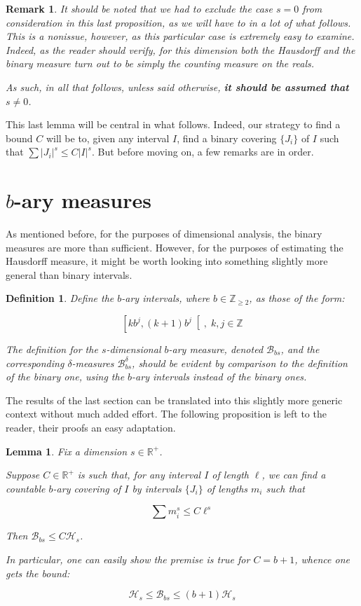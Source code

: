\documentclass[11pt]{amsart}
\newcommand{\R}{\mathbb{R}}
\newcommand{\Z}{\mathbb{Z}}
\newcommand{\HH}{\mathcal{H}}
\newcommand{\BB}{\mathcal{B}}
\newtheorem{lemma}{Lemma}
\newtheorem{definition}{Definition}
\newtheorem{remark}{Remark}
\begin{document}
\begin{remark} \label{dimnotzero}
It should be noted that we had to exclude the case $s = 0$ from consideration in this last proposition, as we will have to in a lot of what follows. This is a nonissue, however, as this particular case is extremely easy to examine. Indeed, as the reader should verify, for this dimension both the Hausdorff and the binary measure turn out to be simply the counting measure on the reals.

As such, in all that follows, unless said otherwise, \textbf{it should be assumed that $s \neq 0$}.
\end{remark}

This last lemma will be central in what follows. Indeed, our strategy to find a bound $C$ will be to, given any interval $I$, find a binary covering $\{J_i\}$ of $I$ such that $\sum \lvert J_i \rvert^s \leq C \lvert I \rvert^s$. But before moving on, a few remarks are in order.

\section{$b$-ary measures}

As mentioned before, for the purposes of dimensional analysis, the binary measures are more than sufficient. However, for the purposes of estimating the Hausdorff measure, it might be worth looking into something slightly more general than binary intervals.

\begin{definition}
Define the $b$-ary intervals, where $b \in \Z_{\geq 2}$, as those of the form:

\[\left[k b^j, (k+1) b^j \right[, \;k, j \in \Z\]

The definition for the $s$-dimensional $b$-ary measure, denoted $\BB_{bs}$, and the corresponding $\delta$-measures $\BB_{bs}^\delta$, should be evident by comparison to the definition of the binary one, using the $b$-ary intervals instead of the binary ones.
\end{definition}

The results of the last section can be translated into this slightly more generic context without much added effort. The following proposition is left to the reader, their proofs an easy adaptation.

\begin{lemma}
Fix a dimension $s \in \R^+$.

Suppose $C \in \R^+$ is such that, for any interval $I$ of length $\ell$, we can find a countable $b$-ary covering of $I$ by intervals $\{J_i\}$ of lengths $m_i$ such that

\[\sum m_i^s \leq C \ell^s\]

Then $\BB_{bs} \leq C \HH_s$.

In particular, one can easily show the premise is true for $C = b+1$, whence one gets the bound:

\[\HH_s \leq \BB_{bs} \leq (b+1) \HH_s\]
\end{lemma}
\end{document}
